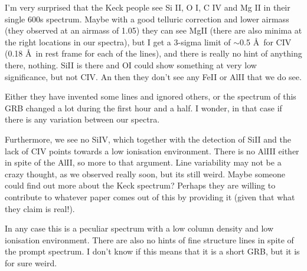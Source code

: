 \documentclass[a4paper,fleqn,usenatbib]{mnras}
\begin{document}
I'm very surprised that the Keck people see Si II, O I, C IV and Mg II in their
single 600s spectrum. Maybe with a good telluric correction and lower airmass
(they observed at an airmass of 1.05) they can see MgII (there are also minima
at the right locations in our spectra), but I get a 3-sigma limit of $\sim$0.5
\AA~for CIV (0.18 \AA~in rest frame for each of the lines), and there is really
no hint of anything there, nothing. SiII is there and OI could show something at
very low significance, but not CIV. An then they don't see any FeII or AlII that
we do see.

Either they have invented some lines and ignored others, or the spectrum of this
GRB changed a lot during the first hour and a half. I wonder, in that case if
there is any variation between our spectra.

Furthermore, we see no SiIV, which together with the detection of SiII and the
lack of CIV points towards a low ionisation environment. There is no AlIII
either in spite of the AlII, so more to that argument. Line variability may not
be a crazy thought, as we observed really soon, but its still weird. Maybe
someone could find out more about the Keck spectrum? Perhaps they are willing to
contribute to whatever paper comes out of this by providing it (given that what
they claim is real!).

In any case this is a peculiar spectrum with a low column density and low
ionisation environment. There are also no hints of fine structure lines in spite
of the prompt spectrum. I don't know if this means that it is a short GRB, but
it is for sure weird.
\end{document}
